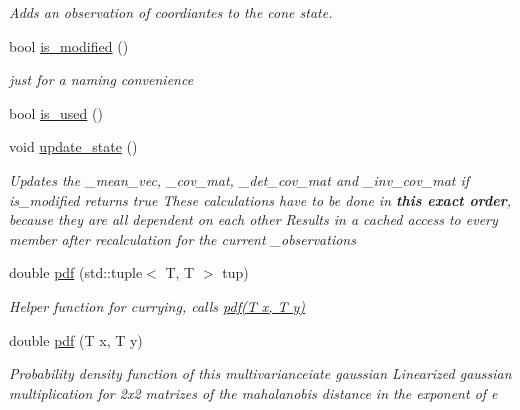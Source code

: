 \begin{DoxyCompactItemize}
\begin{DoxyCompactList}\small\item\em Adds an observation of coordiantes to the cone state. \end{DoxyCompactList}\item 
\mbox{\label{classclara_1_1cone__state_ae8642cde249796203a906df935e35f39}} 
bool \hyperlink{classclara_1_1cone__state_ae8642cde249796203a906df935e35f39}{is\+\_\+modified} ()
\begin{DoxyCompactList}\small\item\em just for a naming convenience \end{DoxyCompactList}\item 
bool \hyperlink{classclara_1_1cone__state_ae3ea1ca7a6af262f71493f45c0734322}{is\+\_\+used} ()
\item 
\mbox{\label{classclara_1_1cone__state_a8cb6454f6a731f69d3e85382b0ae40b4}} 
void \hyperlink{classclara_1_1cone__state_a8cb6454f6a731f69d3e85382b0ae40b4}{update\+\_\+state} ()
\begin{DoxyCompactList}\small\item\em Updates the {\ttfamily \+\_\+mean\+\_\+vec}, {\ttfamily \+\_\+cov\+\_\+mat}, {\ttfamily \+\_\+det\+\_\+cov\+\_\+mat} and {\ttfamily \+\_\+inv\+\_\+cov\+\_\+mat} if {\ttfamily is\+\_\+modified} returns true These calculations have to be done in {\bfseries this exact order}, because they are all dependent on each other Results in a cached access to every member after recalculation for the current {\ttfamily \+\_\+observations} \end{DoxyCompactList}\item 
\mbox{\label{classclara_1_1cone__state_aa437f32412e7b38d40a8bbc054615ef7}} 
double \hyperlink{classclara_1_1cone__state_aa437f32412e7b38d40a8bbc054615ef7}{pdf} (std\+::tuple$<$ T, T $>$ tup)
\begin{DoxyCompactList}\small\item\em Helper function for currying, calls \hyperlink{classclara_1_1cone__state_a90b1ae9171e6196c19da0d883a8c2fdb}{pdf(\+T x, T y)} \end{DoxyCompactList}\item 
double \hyperlink{classclara_1_1cone__state_a90b1ae9171e6196c19da0d883a8c2fdb}{pdf} (T x, T y)
\begin{DoxyCompactList}\small\item\em Probability density function of this multivarianceiate gaussian Linearized gaussian multiplication for 2x2 matrizes of the mahalanobis distance in the exponent of {\ttfamily e} \end{DoxyCompactList}\item 

\end{DoxyCompactItemize}
